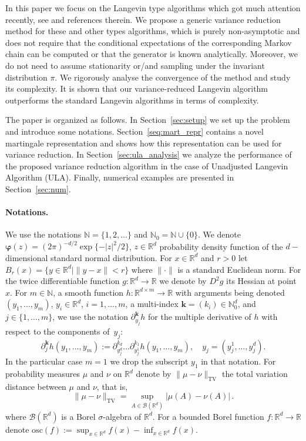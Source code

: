 \documentclass[bj]{imsart}
\def\nset{\mathbb{N}}
\def\rset{\mathbb{R}}
\def\rset{\mathbb{R}}
\newcommand{\tvnorm}[1]{\| #1 \|_{\operatorname{TV}}}
\def\eqsp{\,}
\begin{document}
\par
In this paper we focus on the  Langevin type algorithms which got much attention recently, see \cite{dalalyan2017theoretical,durmus:moulines:2017, MR2353037, MR3861816, MR2977986} and references therein. We propose  a generic variance reduction method for these and other types algorithms, which is purely non-asymptotic and does not require that    the conditional expectations of the corresponding Markov chain can be computed  or that the generator is known analytically. Moreover, we do not need to assume stationarity or/and sampling under the invariant distribution \(\pi.\) We rigorously analyse the convergence of the method and study its complexity. It is shown that  our variance-reduced Langevin algorithm outperforms the standard Langevin algorithms in terms of complexity.
\par
The paper is organized as follows.  In Section~\ref{sec:setup} we set up the problem and introduce some notations. Section~\ref{seq:mart_repr} contains a novel martingale representation and shows how this representation can be used for variance reduction. In Section~\ref{sec:ula_analysis} we analyze the performance of the proposed variance reduction algorithm in the case of Unadjusted Langevin Algorithm (ULA).  Finally, numerical examples are presented in Section~\ref{sec:num}.

\paragraph{Notations. }\label{par:notations}
We use the notations $\nset=\{1,2,\ldots\}$ and $\nset_0=\mathbb N\cup\{0\}$. We denote $\boldsymbol{\varphi}(z)=(2\pi)^{-d/2} \exp\{-|z|^2/2\}$, $z\in\mathbb R^d$ probability density function of the $d-$dimensional standard normal distribution. For $x \in \rset^d$ and $r>0$ let $B_r(x) = \{y \in \rset^d | \|y - x\| < r\}$ where $\|\cdot\|$ is a standard Euclidean norm. For the twice differentiable function $g: \rset^d \rightarrow \rset$ we denote by $D^2g$ its Hessian at point $x$. For $m\in\mathbb N$, a smooth function
$h\colon\mathbb R^{d\times m}\to\mathbb R$
with arguments being denoted
$(y_1,\ldots,y_m)$, $y_i\in\mathbb R^d$, $i=1,\ldots,m$,
a multi-index $\mathbf k=(k_i)\in\mathbb N_0^d$,
and $j\in\{1,\ldots,m\}$,
we use the notation $\partial^{\mathbf k}_{y_j} h$ for the multiple derivative of $h$
with respect to the components of~$y_j$:
\[
\partial^{\mathbf k}_{j} h(y_1,\ldots,y_m)
:=\partial^{k_d}_{y_j^d}
\ldots
\partial^{k_1}_{y_j^1}
h(y_1,\ldots,y_m),
\quad y_j=(y_j^1,\ldots,y_j^d).
\]
In the particular case $m=1$ we drop the subscript $y_1$ in that notation. For probability measures $\mu$ and $\nu$ on $\rset^d$ denote by $\tvnorm{\mu-\nu}$ the total variation distance between $\mu$ and $\nu$, that is,
\[
\tvnorm{\mu-\nu}=\sup_{A \in \mathcal{B}(\rset^d)}
|\mu(A)-\nu(A)| \eqsp.
\]
where $\mathcal{B}(\rset^d)$ is a Borel $\sigma$-algebra of $\rset^d$. For a bounded Borel function $f: \rset^d \rightarrow \rset$ denote $\mathrm{osc}(f):=\sup_{x\in\mathbb R^d}f(x)-\inf_{x\in\mathbb R^d}f(x)$.
\end{document}
